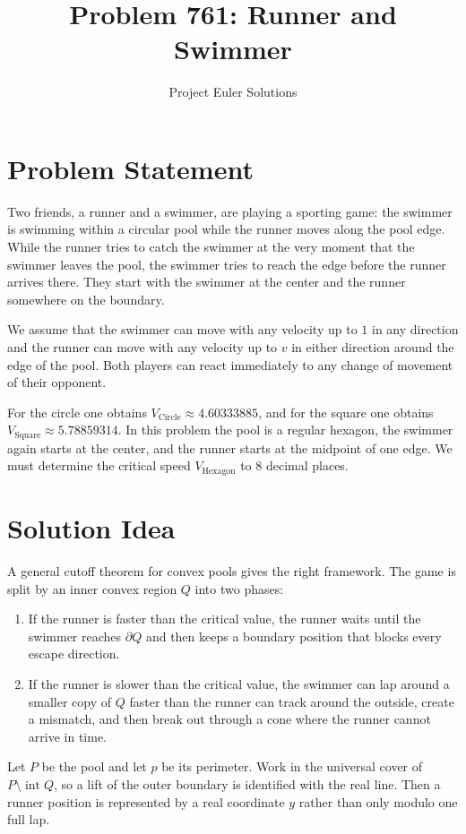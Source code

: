 \documentclass[11pt]{article}
\title{Problem 761: Runner and Swimmer}
\author{Project Euler Solutions}
\date{}
\begin{document}
\maketitle

\section{Problem Statement}
Two friends, a runner and a swimmer, are playing a sporting game: the swimmer is swimming within a circular pool while the runner moves along the pool edge. While the runner tries to catch the swimmer at the very moment that the swimmer leaves the pool, the swimmer tries to reach the edge before the runner arrives there. They start with the swimmer at the center and the runner somewhere on the boundary.

We assume that the swimmer can move with any velocity up to $1$ in any direction and the runner can move with any velocity up to $v$ in either direction around the edge of the pool. Both players can react immediately to any change of movement of their opponent.

For the circle one obtains $V_{\mathrm{Circle}} \approx 4.60333885$, and for the square one obtains $V_{\mathrm{Square}} \approx 5.78859314$. In this problem the pool is a regular hexagon, the swimmer again starts at the center, and the runner starts at the midpoint of one edge. We must determine the critical speed $V_{\mathrm{Hexagon}}$ to $8$ decimal places.

\section{Solution Idea}
A general cutoff theorem for convex pools gives the right framework. The game is split by an inner convex region $Q$ into two phases:
\begin{enumerate}
    \item If the runner is faster than the critical value, the runner waits until the swimmer reaches $\partial Q$ and then keeps a boundary position that blocks every escape direction.
    \item If the runner is slower than the critical value, the swimmer can lap around a smaller copy of $Q$ faster than the runner can track around the outside, create a mismatch, and then break out through a cone where the runner cannot arrive in time.
\end{enumerate}

Let $P$ be the pool and let $p$ be its perimeter. Work in the universal cover of $P \setminus \operatorname{int} Q$, so a lift of the outer boundary is identified with the real line. Then a runner position is represented by a real coordinate $y$ rather than only modulo one full lap.
\end{document}
